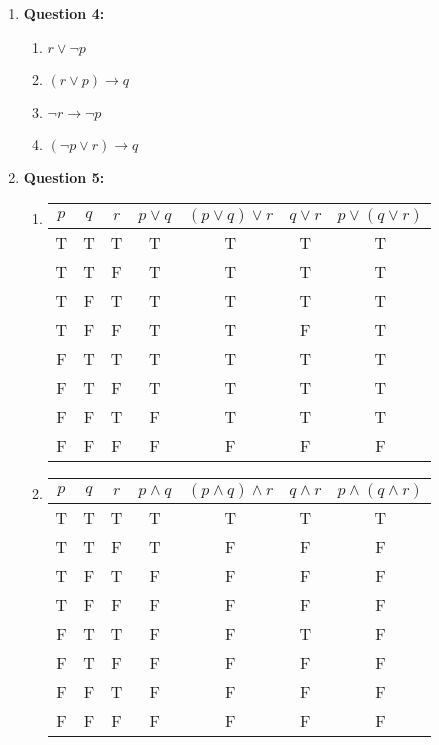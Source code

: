 \documentclass[11pt]{article}
\begin{document}
\begin{enumerate}
\item
\textbf{Question 4:}

\begin{enumerate}[label=(\alph*)]
\item
$r \lor \lnot p$

\item
$(r \lor p) \rightarrow q$

\item
$\lnot r \rightarrow \lnot p$

\item
$(\lnot p \lor r) \rightarrow q$

\end{enumerate}

\item
\textbf{Question 5:}

\begin{enumerate}[label=(\alph*)]
\item
\begin{center}
\begin{tabular}{|c|c|c|c|c|c|c|}
\hline
$p$ & $q$ & $r$ & $p \lor q$ & $(p \lor q) \lor r$ & $q \lor r$ & $p \lor (q \lor r)$\\
\hline
T & T & T & T & T & T & T\\
T & T & F & T & T & T & T\\
T & F & T & T & T & T & T\\
T & F & F & T & T & F & T\\
F & T & T & T & T & T & T\\
F & T & F & T & T & T & T\\
F & F & T & F & T & T & T\\
F & F & F & F & F & F & F\\
\hline
\end{tabular}
\end{center}

\item
\begin{center}
\begin{tabular}{|c|c|c|c|c|c|c|}
\hline
$p$ & $q$ & $r$ & $p \land q$ & $(p \land q) \land r$ & $q \land r$ & $p \land (q \land r)$\\
\hline
T & T & T & T & T & T & T\\
T & T & F & T & F & F & F\\
T & F & T & F & F & F & F\\
T & F & F & F & F & F & F\\
F & T & T & F & F & T & F\\
F & T & F & F & F & F & F\\
F & F & T & F & F & F & F\\
F & F & F & F & F & F & F\\
\hline
\end{tabular}
\end{center}
\end{enumerate}


\end{enumerate}
\end{document}

